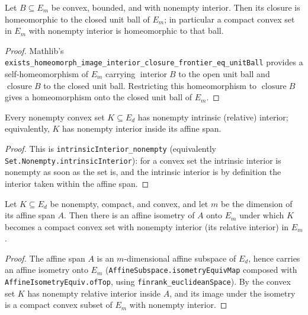 \begin{lemma}
    \label{lem:convex-body-homeo-ball}
    Let $B \subseteq E_m$ be convex, bounded, and with nonempty interior. Then
    its closure is homeomorphic to the closed unit ball of $E_m$; in particular a
    compact convex set in $E_m$ with nonempty interior is homeomorphic to that
    ball.
\end{lemma}
\begin{proof}
    Mathlib's
    \texttt{exists\_homeomorph\_image\_interior\_closure\_frontier\_eq\_unitBall}
    provides a self-homeomorphism of $E_m$ carrying $\operatorname{interior} B$
    to the open unit ball and $\operatorname{closure} B$ to the closed unit ball.
    Restricting this homeomorphism to $\operatorname{closure} B$ gives a
    homeomorphism onto the closed unit ball of $E_m$.
\end{proof}

\begin{lemma}
    \label{lem:convex-relint-nonempty}
    \leanok
    Every nonempty convex set $K \subseteq E_d$ has nonempty intrinsic (relative)
    interior; equivalently, $K$ has nonempty interior inside its affine span.
\end{lemma}
\begin{proof}
    This is \texttt{intrinsicInterior\_nonempty} (equivalently
    \texttt{Set.Nonempty.intrinsicInterior}): for a convex set the intrinsic
    interior is nonempty as soon as the set is, and the intrinsic interior is by
    definition the interior taken within the affine span.
\end{proof}

\begin{lemma}
    \label{lem:affine-span-iso}
    Let $K \subseteq E_d$ be nonempty, compact, and convex, and let $m$ be the
    dimension of its affine span $A$. Then there is an affine isometry of $A$
    onto $E_m$ under which $K$ becomes a compact convex set with nonempty
    interior (its relative interior) in $E_m$.
\end{lemma}
\begin{proof}
    The affine span $A$ is an $m$-dimensional affine subspace of $E_d$, hence
    carries an affine isometry onto $E_m$ (\texttt{AffineSubspace.isometryEquivMap}
    composed with \texttt{AffineIsometryEquiv.ofTop}, using
    \texttt{finrank\_euclideanSpace}). By  the
    convex set $K$ has nonempty relative interior inside $A$, and its image under
    the isometry is a compact convex subset of $E_m$ with nonempty interior.
\end{proof}

